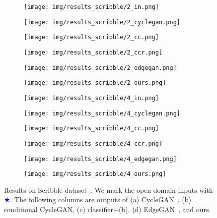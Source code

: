 \documentclass[10pt,twocolumn,letterpaper]{article}
\begin{document}
\begin{figure}[tbp]
\begin{center}
  \begin{subfigure}[b]{\scribblewidth\linewidth}
  \texttt{[image: img/results\_scribble/2\_in.png]}
  \end{subfigure}
  \begin{subfigure}[b]{\scribblewidth\linewidth}
  \texttt{[image: img/results\_scribble/2\_cyclegan.png]}
  \end{subfigure}
   \begin{subfigure}[b]{\scribblewidth\linewidth}
  \texttt{[image: img/results\_scribble/2\_cc.png]}
  \end{subfigure}
   \begin{subfigure}[b]{\scribblewidth\linewidth}
  \texttt{[image: img/results\_scribble/2\_ccr.png]}
  \end{subfigure}
 \begin{subfigure}[b]{\scribblewidth\linewidth}
  \texttt{[image: img/results\_scribble/2\_edgegan.png]}
  \end{subfigure}
  \begin{subfigure}[b]{\scribblewidth\linewidth}
  \texttt{[image: img/results\_scribble/2\_ours.png]}
  \end{subfigure}
  
  \begin{subfigure}[b]{\scribblewidth\linewidth}
  \texttt{[image: img/results\_scribble/4\_in.png]}
  \end{subfigure}
  \begin{subfigure}[b]{\scribblewidth\linewidth}
  \texttt{[image: img/results\_scribble/4\_cyclegan.png]}
  \end{subfigure}
\begin{subfigure}[b]{\scribblewidth\linewidth}
  \texttt{[image: img/results\_scribble/4\_cc.png]}
  \end{subfigure}
\begin{subfigure}[b]{\scribblewidth\linewidth}
  \texttt{[image: img/results\_scribble/4\_ccr.png]}
  \end{subfigure}
\begin{subfigure}[b]{\scribblewidth\linewidth}
  \texttt{[image: img/results\_scribble/4\_edgegan.png]}
  \end{subfigure}
  \begin{subfigure}[b]{\scribblewidth\linewidth}
  \texttt{[image: img/results\_scribble/4\_ours.png]}
  \end{subfigure}
\end{center}
\caption{Results on Scribble dataset~\cite{ghosh2019interactive}. We mark the open-domain inputs with \textcolor{blue}{$\bigstar$}. The following columns are outputs of (a) CycleGAN~\cite{zhu2017unpaired}, (b) conditional CycleGAN, (c) classifier+(b), (d) EdgeGAN~\cite{gao2020sketchycoco}, and ours.}
 \label{fig:scribble_results}
\end{figure}
\end{document}
